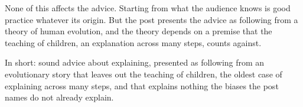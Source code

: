 \begin{afterword}
None of this affects the advice. Starting from what the audience knows is good practice whatever its origin. But the post presents the advice as following from a theory of human evolution, and the theory depends on a premise that the teaching of children, an explanation across many steps, counts against.

In short: sound advice about explaining, presented as following from an evolutionary story that leaves out the teaching of children, the oldest case of explaining across many steps, and that explains nothing the biases the post names do not already explain.
\end{afterword}
